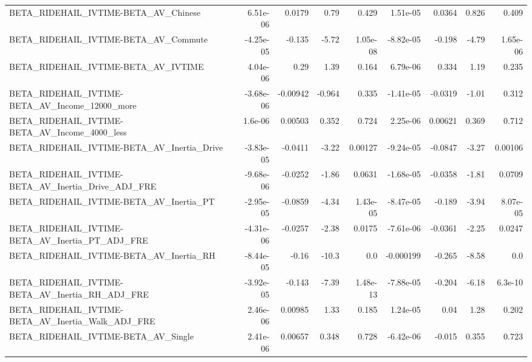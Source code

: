 \begin{tabular}{lrrrrrrrr}
BETA\_RIDEHAIL\_IVTIME-BETA\_AV\_Chinese               &    6.51e-06 &       0.0179 &     0.79 &    0.429 &   1.51e-05 &      0.0364 &        0.826 &         0.409 \\
BETA\_RIDEHAIL\_IVTIME-BETA\_AV\_Commute               &   -4.25e-05 &       -0.135 &    -5.72 & 1.05e-08 &  -8.82e-05 &      -0.198 &        -4.79 &      1.65e-06 \\
BETA\_RIDEHAIL\_IVTIME-BETA\_AV\_IVTIME                &    4.04e-06 &         0.29 &     1.39 &    0.164 &   6.79e-06 &       0.334 &         1.19 &         0.235 \\
BETA\_RIDEHAIL\_IVTIME-BETA\_AV\_Income\_12000\_more     &   -3.68e-06 &     -0.00942 &   -0.964 &    0.335 &  -1.41e-05 &     -0.0319 &        -1.01 &         0.312 \\
BETA\_RIDEHAIL\_IVTIME-BETA\_AV\_Income\_4000\_less      &     1.6e-06 &      0.00503 &    0.352 &    0.724 &   2.25e-06 &     0.00621 &        0.369 &         0.712 \\
BETA\_RIDEHAIL\_IVTIME-BETA\_AV\_Inertia\_Drive         &   -3.83e-05 &      -0.0411 &    -3.22 &  0.00127 &  -9.24e-05 &     -0.0847 &        -3.27 &       0.00106 \\
BETA\_RIDEHAIL\_IVTIME-BETA\_AV\_Inertia\_Drive\_ADJ\_FRE &   -9.68e-06 &      -0.0252 &    -1.86 &   0.0631 &  -1.68e-05 &     -0.0358 &        -1.81 &        0.0709 \\
BETA\_RIDEHAIL\_IVTIME-BETA\_AV\_Inertia\_PT            &   -2.95e-05 &      -0.0859 &    -4.34 & 1.43e-05 &  -8.47e-05 &      -0.189 &        -3.94 &      8.07e-05 \\
BETA\_RIDEHAIL\_IVTIME-BETA\_AV\_Inertia\_PT\_ADJ\_FRE    &   -4.31e-06 &      -0.0257 &    -2.38 &   0.0175 &  -7.61e-06 &     -0.0361 &        -2.25 &        0.0247 \\
BETA\_RIDEHAIL\_IVTIME-BETA\_AV\_Inertia\_RH            &   -8.44e-05 &        -0.16 &    -10.3 &      0.0 &  -0.000199 &      -0.265 &        -8.58 &           0.0 \\
BETA\_RIDEHAIL\_IVTIME-BETA\_AV\_Inertia\_RH\_ADJ\_FRE    &   -3.92e-05 &       -0.143 &    -7.39 & 1.48e-13 &  -7.88e-05 &      -0.204 &        -6.18 &       6.3e-10 \\
BETA\_RIDEHAIL\_IVTIME-BETA\_AV\_Inertia\_Walk\_ADJ\_FRE  &    2.46e-06 &      0.00985 &     1.33 &    0.185 &   1.24e-05 &        0.04 &         1.28 &         0.202 \\
BETA\_RIDEHAIL\_IVTIME-BETA\_AV\_Single                &    2.41e-06 &      0.00657 &    0.348 &    0.728 &  -6.42e-06 &      -0.015 &        0.355 &         0.723 \\

\end{tabular}
